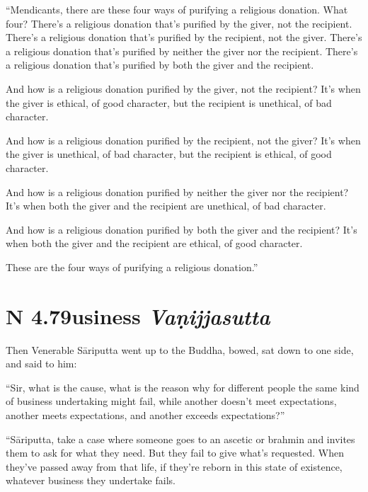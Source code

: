 \documentclass[12pt,openany]{book}%
\newcommand*{\suttatitleacronym}[1]{\smaller[2]{#1}\vspace*{.3em}}
\newcommand*{\suttatitletranslation}[1]{\linebreak{#1}}
\newcommand*{\suttatitleroot}[1]{\linebreak\smaller[2]\itshape{#1}}
\newcommand*{\tocacronym}[1]{\hspace*{-3.3em}{#1}\quad}
\newcommand*{\toctranslation}[1]{#1}
\newcommand*{\tocroot}[1]{(\textit{#1})}
\begin{document}
“Mendicants, there are these four ways of purifying a religious donation. What four? There’s a religious donation that’s purified by the giver, not the recipient. There’s a religious donation that’s purified by the recipient, not the giver. There’s a religious donation that’s purified by neither the giver nor the recipient. There’s a religious donation that’s purified by both the giver and the recipient. 

And how is a religious donation purified by the giver, not the recipient? It’s when the giver is ethical, of good character, but the recipient is unethical, of bad character. 

And how is a religious donation purified by the recipient, not the giver? It’s when the giver is unethical, of bad character, but the recipient is ethical, of good character. 

And how is a religious donation purified by neither the giver nor the recipient? It’s when both the giver and the recipient are unethical, of bad character. 

And how is a religious donation purified by both the giver and the recipient? It’s when both the giver and the recipient are ethical, of good character. 

These are the four ways of purifying a religious donation.” 

%
\section*{{\suttatitleacronym AN 4.79}{\suttatitletranslation Business }{\suttatitleroot Vaṇijjasutta}}
\addcontentsline{toc}{section}{\tocacronym{AN 4.79} \toctranslation{Business } \tocroot{Vaṇijjasutta}}

Then Venerable \textsanskrit{Sāriputta} went up to the Buddha, bowed, sat down to one side, and said to him: 

“Sir, what is the cause, what is the reason why for different people the same kind of business undertaking might fail, while another doesn’t meet expectations, another meets expectations, and another exceeds expectations?” 

“\textsanskrit{Sāriputta}, take a case where someone goes to an ascetic or brahmin and invites them to ask for what they need. But they fail to give what’s requested. When they’ve passed away from that life, if they’re reborn in this state of existence, whatever business they undertake fails. 
\end{document}
